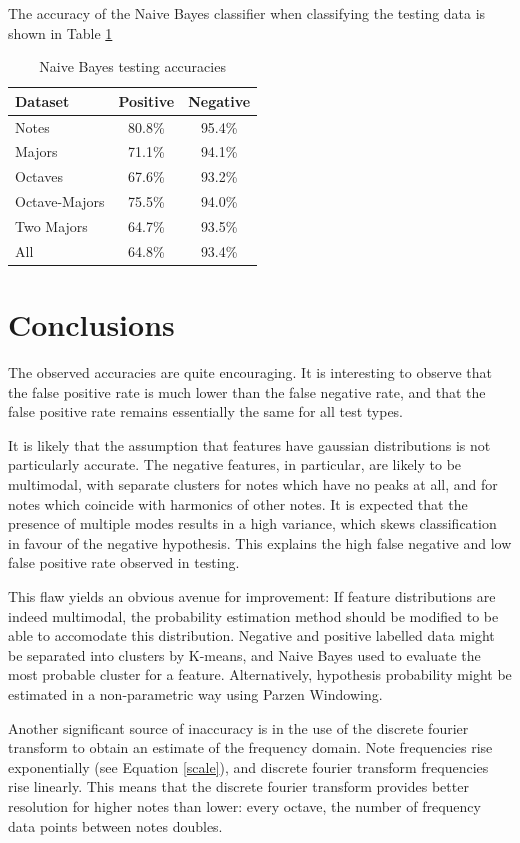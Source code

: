\documentclass[twocolumn]{article}
\begin{document}
The accuracy of the Naive Bayes classifier when classifying the testing data is shown in Table \ref{testing}

\begin{table}[htb]
\centering
\begin{tabular}{|l|c|c|}
\hline
Dataset & Positive & Negative \\
\hline
Notes & 80.8\% & 95.4\% \\
\hline
Majors & 71.1\% & 94.1\% \\
\hline
Octaves & 67.6\% & 93.2\% \\
\hline
Octave-Majors & 75.5\% & 94.0\%  \\
\hline
Two Majors & 64.7\% & 93.5\%  \\
\hline
All & 64.8\% & 93.4\%  \\
\hline
\end{tabular}
\caption{Naive Bayes testing accuracies}
\label{testing}
\end{table}

\section{Conclusions}
The observed accuracies are quite encouraging. It is interesting to observe that the false positive rate is much lower than the false negative rate, and that the false positive rate remains essentially the same for all test types.

It is likely that the assumption that features have gaussian distributions is not particularly accurate.  The negative features, in particular, are likely to be multimodal, with separate clusters for notes which have no peaks at all, and for notes which coincide with harmonics of other notes.  It is expected that the presence of multiple modes results in a high variance, which skews classification in favour of the negative hypothesis.  This explains the high false negative and low false positive rate observed in testing.

This flaw yields an obvious avenue for improvement:  If feature distributions are indeed multimodal, the probability estimation method should be modified to be able to accomodate this distribution.  Negative and positive labelled data might be separated into clusters by K-means, and Naive Bayes used to evaluate the most probable cluster for a feature.  Alternatively, hypothesis probability might be estimated in a non-parametric way using Parzen Windowing.

Another significant source of inaccuracy is in the use of the discrete fourier transform to obtain an estimate of the frequency domain.  Note frequencies rise exponentially (see Equation \ref{scale}), and discrete fourier transform frequencies rise linearly.  This means that the discrete fourier transform provides better resolution for higher notes than lower: every octave, the number of frequency data points between notes doubles.
\end{document}
